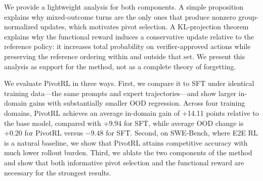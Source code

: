 We provide a lightweight analysis for both components. A simple proposition explains why mixed-outcome turns are the only ones that produce nonzero group-normalized updates, which motivates pivot selection. A KL-projection theorem explains why the functional reward induces a conservative update relative to the reference policy: it increases total probability on verifier-approved actions while preserving the reference ordering within and outside that set. We present this analysis as support for the method, not as a complete theory of forgetting.

We evaluate PivotRL in three ways. First, we compare it to SFT under identical training data---the same prompts and expert trajectories---and show larger in-domain gains with substantially smaller OOD regression. Across four training domains, PivotRL achieves an average in-domain gain of +14.11 points relative to the base model, compared with +9.94 for SFT, while average OOD change is +0.20 for PivotRL versus $-9.48$ for SFT. Second, on SWE-Bench, where E2E RL is a natural baseline, we show that PivotRL attains competitive accuracy with much lower rollout burden. Third, we ablate the two components of the method and show that both informative pivot selection and the functional reward are necessary for the strongest results.

